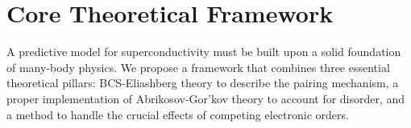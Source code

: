 \section{Core Theoretical Framework}
A predictive model for superconductivity must be built upon a solid foundation of many-body physics. We propose a framework that combines three essential theoretical pillars: BCS-Eliashberg theory to describe the pairing mechanism, a proper implementation of Abrikosov-Gor'kov theory to account for disorder, and a method to handle the crucial effects of competing electronic orders.




